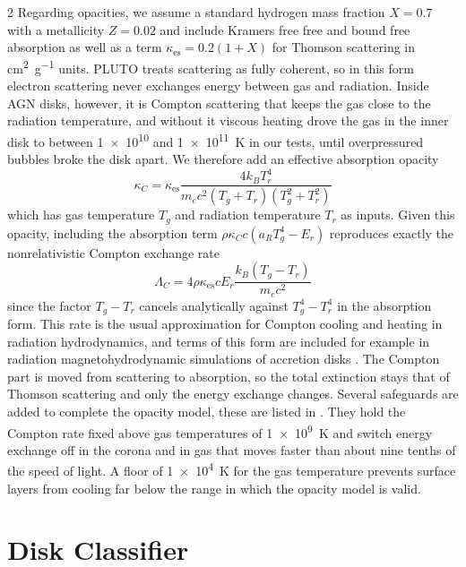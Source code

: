 \begin{multicols}{2}
	Regarding opacities, we assume a standard hydrogen mass fraction $X = 0.7$ with a metallicity $Z = 0.02$ and include Kramers
	free free and bound free absorption \cite{kram1923} as well as a term $\kappa_\mathrm{es} = 0.2 \left(1 + X\right)$ for Thomson scattering
	in \unit{\centi\meter\squared\per\gram} units. PLUTO treats scattering as fully coherent, so in this form electron scattering never
	exchanges energy between gas and radiation. Inside AGN disks, however, it is Compton scattering that keeps the gas close to the
	radiation temperature, and without it viscous heating drove the gas in the inner disk to between \num{1e10} and
	\qty{1e11}{\kelvin} in our tests, until overpressured bubbles broke the disk apart. We therefore add an effective absorption
	opacity
	\begin{equation}
		\kappa_C = \kappa_\mathrm{es} \frac{4 k_B T_r^4}{m_e c^2 \left(T_g + T_r\right) \left(T_g^2 + T_r^2\right)}
		\label{eq:compton}
	\end{equation}
	which has gas temperature $T_g$ and radiation temperature $T_r$ as inputs. Given this opacity, including the absorption term
	$\rho \kappa_C c \left(a_R T_g^4 - E_r\right)$ reproduces exactly the nonrelativistic Compton exchange rate
	\begin{equation}
		\Lambda_C = 4 \rho \kappa_\mathrm{es} c E_r \frac{k_B \left(T_g - T_r\right)}{m_e c^2}
	\end{equation}
	since the factor $T_g - T_r$ cancels analytically against $T_g^4 - T_r^4$ in the absorption form. This rate is the usual
	approximation for Compton cooling and heating in radiation hydrodynamics, and terms of this form are included for example in
	radiation magnetohydrodynamic simulations of accretion disks \cite{jian2019}. The Compton part is moved from scattering to absorption, so
	the total extinction stays that of Thomson scattering and only the energy exchange changes. Several safeguards are added to complete the
	opacity model, these are listed in . They hold the Compton rate fixed above gas temperatures of
	\qty{1e9}{\kelvin} and switch energy exchange off in the corona and in gas that moves faster than about nine tenths of
	the speed of light. A floor of \qty{1e4}{\kelvin} for the gas temperature prevents surface layers from cooling far below the
	range in which the opacity model is valid.

	\section{Disk Classifier}
	\label{sec:classifier}


\end{multicols}
